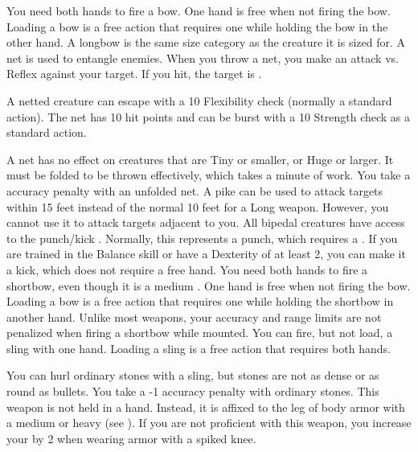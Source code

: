          You need both hands to fire a bow. One hand is free when not firing the bow. Loading a bow is a free action that requires one  while holding the bow in the other hand.
        A longbow is the same size category as the creature it is sized for.
         A net is used to entangle enemies. When you throw a net, you make an attack vs. Reflex against your target. If you hit, the target is \slowed.
        \par A netted creature can escape with a  10 Flexibility check (normally a standard action). The net has 10 hit points and can be burst with a  10 Strength check as a standard action.
        \par A net has no effect on creatures that are Tiny or smaller, or Huge or larger. It must be folded to be thrown effectively, which takes a minute of work. You take a  accuracy penalty with an unfolded net.
         A pike can be used to attack targets within 15 feet instead of the normal 10 feet for a Long weapon.
        However, you cannot use it to attack targets adjacent to you.
         All bipedal creatures have access to the punch/kick .
        Normally, this represents a punch, which requires a .
        If you are trained in the Balance skill or have a Dexterity of at least 2, you can make it a kick, which does not require a free hand.
         You need both hands to fire a shortbow, even though it is a medium . One hand is free when not firing the bow. Loading a bow is a free action that requires one  while holding the shortbow in another hand.
        Unlike most  weapons, your accuracy and range limits are not penalized when firing a shortbow while mounted.
         You can fire, but not load, a sling with one hand. Loading a sling is a free action that requires both hands.
        \par You can hurl ordinary stones with a sling, but stones are not as dense or as round as bullets. You take a -1 accuracy penalty with ordinary stones.
         This weapon is not held in a hand.
        Instead, it is affixed to the leg of body armor with a medium or heavy  (see ).
        If you are not proficient with this weapon, you increase your  by 2 when wearing armor with a spiked knee.
